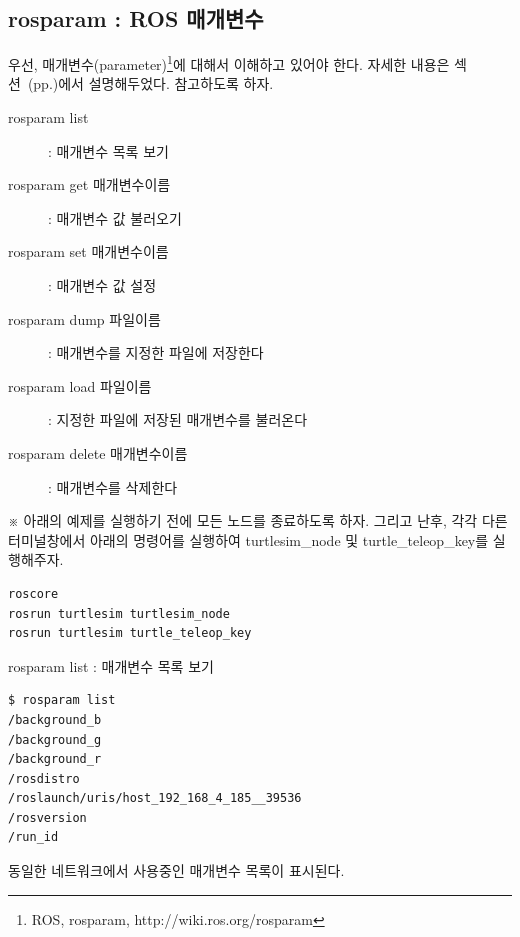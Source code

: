 \subsection{rosparam : ROS 매개변수}

우선, 매개변수(parameter)\footnote{ROS, rosparam, http://wiki.ros.org/rosparam}에 대해서 이해하고 있어야 한다. 자세한 내용은 섹션~(pp.\pageref{def:RosParameter})에서 설명해두었다. 참고하도록 하자.

\vspace{\baselineskip}
\noindent
\begin{description}
\item[rosparam list] : 매개변수 목록 보기
\item[rosparam get 매개변수이름] : 매개변수 값 불러오기
\item[rosparam set 매개변수이름] : 매개변수 값 설정 
\item[rosparam dump 파일이름] : 매개변수를 지정한 파일에 저장한다
\item[rosparam load 파일이름] : 지정한 파일에 저장된 매개변수를 불러온다
\item[rosparam delete 매개변수이름] : 매개변수를 삭제한다 
\end{description}

\vspace{\baselineskip}
\noindent
※ 아래의 예제를 실행하기 전에 모든 노드를 종료하도록 하자. 그리고 난후, 각각 다른 터미널창에서 아래의 명령어를 실행하여 turtlesim\_node 및 turtle\_teleop\_key를 실행해주자.

\begin{lstlisting}[language=ROS]
roscore
rosrun turtlesim turtlesim_node 
rosrun turtlesim turtle_teleop_key
\end{lstlisting}

\setcounter{num}{0}

\vspace{\baselineskip}
\noindent
{}\circled{\thenum} rosparam list : 매개변수 목록 보기

\begin{lstlisting}[language=ROS]
$ rosparam list
/background_b
/background_g
/background_r
/rosdistro
/roslaunch/uris/host_192_168_4_185__39536
/rosversion
/run_id
\end{lstlisting}

\noindent
동일한 네트워크에서 사용중인 매개변수 목록이 표시된다.

